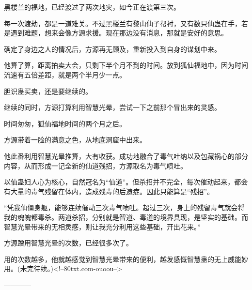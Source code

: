 \begin{this_body}
黑楼兰的福地，已经渡过了两次地灾，如今正在渡第三次。

每一次渡劫，都是一道难关。不过黑楼兰有黎山仙子帮衬，又有数只仙蛊在手，若是遇到难题，想来会像方源求援。现在那边没有消息，那就是安好的意思。

确定了身边之人的情况后，方源再无顾及，重新投入到自身的谋划中来。

他算了算，距离拍卖大会，只剩下半个月不到的时间。放到狐仙福地中，因为时间流速有五倍差距，就是两个半月少一点。

胆识蛊买卖，还是要继续的。

继续的同时，方源打算利用智慧光晕，尝试一下之前那个冒出来的灵感。

时间匆匆，狐仙福地时间的两个月之后。

方源带着一脸的满意之色，从地底洞窟中出来。

他此番利用智慧光晕推算，大有收获。成功地融合了毒气吐纳以及包藏祸心的部分内容，从而形成一记全新的仙道残招，方源取名为毒气喷吐。

以仙蛊妇人心为核心，自然冠名为“仙道”。但杀招并不完全，每次催动起来，都会有大量的毒气残留在体内，造成残毒的后遗症。因此只能算是“残招”。

“凭我仙僵身躯，能够连续催动三次毒气喷吐。超过三次，身上的残留毒气就会将我的魂魄都毒杀。两道杀招，分别就是智道、毒道的境界具现，是坚实的基础。而智慧光晕带来的无相灵感，则让我充分利用这些基础，开出花来。”

方源蹭用智慧光晕的次数，已经很多次了。

用的次数越多，他就越感觉到智慧光晕带来的便利，越发感慨智慧蛊的无上威能妙用。(未完待续。)<!--80txt.com-ouoou-->

------------

\end{this_body}

